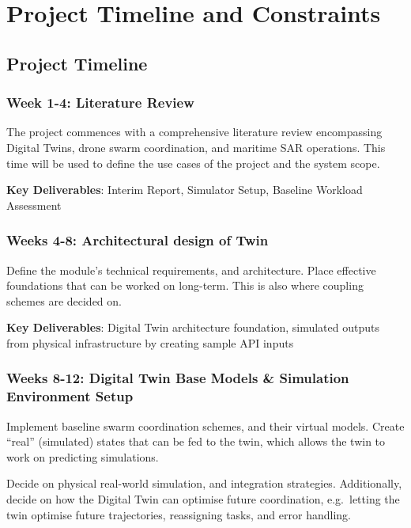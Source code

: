 \section{Project Timeline and Constraints}\label{sec:project-timeline-and-constraints}

\subsection{Project Timeline}\label{subsec:project-timeline}

\subsubsection{Week 1-4: Literature Review}\label{subsubsec:literature-review}
The project commences with a comprehensive literature review encompassing Digital Twins, drone swarm coordination, and maritime SAR operations.
This time will be used to define the use cases of the project and the system scope.

\textbf{Key Deliverables}: Interim Report, Simulator Setup, Baseline Workload Assessment

\subsubsection{Weeks 4-8: Architectural design of Twin}\label{subsubsec:architectural-design-of-twin}
Define the module’s technical requirements, and architecture.
Place effective foundations that can be worked on long-term.
This is also where coupling schemes are decided on.

\textbf{Key Deliverables}: Digital Twin architecture foundation, simulated outputs from physical infrastructure by creating sample API inputs

\subsubsection{Weeks 8-12: Digital Twin Base Models \& Simulation Environment Setup}\label{subsubsec:digital-twin-base-models-&-simulation-environment-setup}
Implement baseline swarm coordination schemes, and their virtual models.
Create ``real'' (simulated) states that can be fed to the twin, which allows the twin to work on predicting simulations.

Decide on physical real-world simulation, and integration strategies.
Additionally, decide on how the Digital Twin can optimise future coordination, e.g.\ letting the twin optimise future trajectories, reassigning tasks, and error handling.

